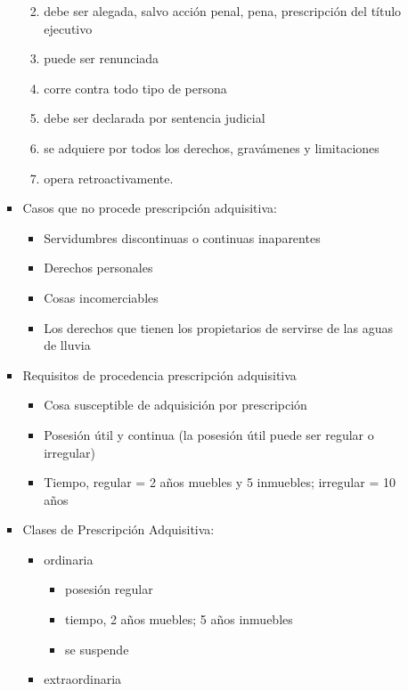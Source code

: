 \documentclass[]{article}
\providecommand{\tightlist}{%
  \setlength{\itemsep}{0pt}\setlength{\parskip}{0pt}}
\begin{document}
\begin{itemize}
\begin{itemize}
\begin{itemize}
      \begin{enumerate}
      \def\labelenumi{\arabic{enumi}.}
      \tightlist
      \item
        debe ser alegada, salvo acción penal, pena, prescripción del
        título ejecutivo
      \item
        puede ser renunciada
      \item
        corre contra todo tipo de persona
      \item
        debe ser declarada por sentencia judicial
      \item
        se adquiere por todos los derechos, gravámenes y limitaciones
      \item
        opera retroactivamente.
      \end{enumerate}
    \item
      Casos que no procede prescripción adquisitiva:

      \begin{itemize}
      \tightlist
      \item
        Servidumbres discontinuas o continuas inaparentes
      \item
        Derechos personales
      \item
        Cosas incomerciables
      \item
        Los derechos que tienen los propietarios de servirse de las
        aguas de lluvia
      \end{itemize}
    \item
      Requisitos de procedencia prescripción adquisitiva

      \begin{itemize}
      \tightlist
      \item
        Cosa susceptible de adquisición por prescripción
      \item
        Posesión útil y continua (la posesión útil puede ser regular o
        irregular)
      \item
        Tiempo, regular = 2 años muebles y 5 inmuebles; irregular = 10
        años
      \end{itemize}
    \item
      Clases de Prescripción Adquisitiva:

      \begin{itemize}
      \tightlist
      \item
        ordinaria

        \begin{itemize}
        \tightlist
        \item
          posesión regular
        \item
          tiempo, 2 años muebles; 5 años inmuebles
        \item
          se suspende
        \end{itemize}
      \item
        extraordinaria


\end{itemize}
\end{itemize}
\end{itemize}
\end{itemize}
\end{document}

